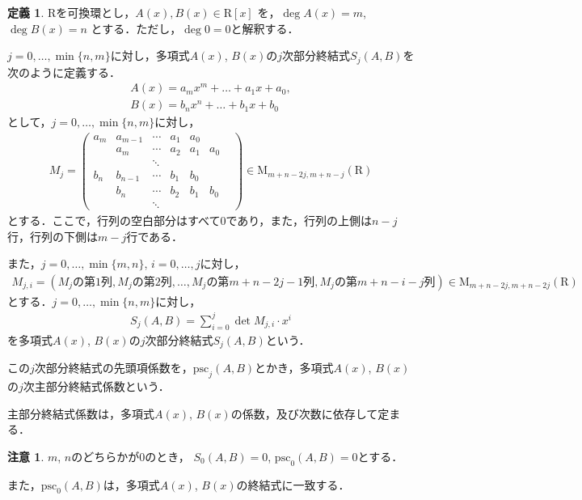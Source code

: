 \documentclass[uplatex, dvipdfmx]{jsarticle}
\newcommand{\psc}{\mathrm{psc}}
\theoremstyle{definition}
\newtheorem{definition}{定義}[section]
\newtheorem{remark}{注意}[section]
\begin{document}
\begin{definition}
$\mathrm{R}$を可換環とし，$A(x), B(x) \in \mathrm{R}[x]$ を，$\deg A(x) = m$, $\deg B(x) = n$ とする．ただし，$\deg 0 = 0$と解釈する．

$j = 0, \dots, \min\{n, m\}$に対し，多項式$A(x)$, $B(x)$の$j$次部分終結式$S_j(A, B)$を次のように定義する．
\begin{align*}
A(x) = a_m x^m + \dots + a_1 x + a_0, \\
B(x) = b_n x^n + \dots + b_1 x + b_0 
\end{align*}
として，$j = 0, \dots, \min\{n,m\}$に対し，
\begin{align*}
M_j = 
\begin{pmatrix}
a_m & a_{m-1} & \cdots & a_1 & a_0 &    &  \\
     &  a_m     & \cdots & a_2 & a_1& a_0 &  \\
     &   & \ddots &  & & \\
b_n & b_{n-1} & \cdots & b_1 & b_0 &    & \\
     &  b_n     & \cdots & b_2 & b_1& b_0 & \\
     &   & \ddots &  & & 
\end{pmatrix}
\in \mathrm{M}_{m+n-2j, m+n-j}(\mathrm{R})
\end{align*}
とする．ここで，行列の空白部分はすべて$0$であり，また，行列の上側は$n-j$行，行列の下側は$m-j$行である．

また，$j = 0, \dots, \min\{m,n\}$, $i = 0, \dots, j$に対し，
\begin{align*}
M_{j,i} = (\text{$M_j$の第$1$列}, \text{$M_j$の第$2$列}, \dots ,\text{$M_j$の第$m+n-2j-1$列}, \text{$M_j$の第$m+n-i-j$列})
\in \mathrm{M}_{m+n-2j, m+n-2j}(\mathrm{R})
\end{align*}
とする．$j = 0, \dots, \min\{n, m\}$に対し，
\begin{align*}
S_j(A, B) = \sum_{i=0}^j \det M_{j, i} \cdot x^i 
\end{align*}
を多項式$A(x)$, $B(x)$の$j$次部分終結式$S_j(A, B)$という．

この$j$次部分終結式の先頭項係数を，$\psc_j(A,B)$とかき，多項式$A(x)$, $B(x)$の$j$次主部分終結式係数という．
\end{definition}


主部分終結式係数は，多項式$A(x)$, $B(x)$の係数，及び次数に依存して定まる．

\begin{remark}
$m$, $n$のどちらかが$0$のとき，
$S_0(A,B) = 0$, $\psc_0(A,B) = 0$とする．

また，$\psc_0(A,B)$は，多項式$A(x)$, $B(x)$の終結式に一致する．
\end{remark}
\end{document}

